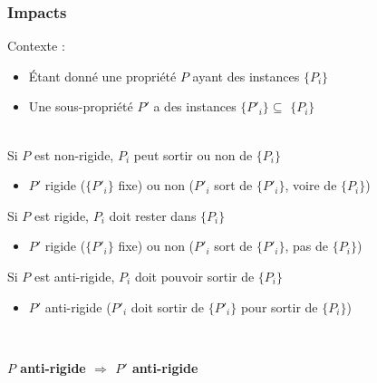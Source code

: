 \documentclass[draft]{beamer}
\begin{document}
\begin{frame}
\frametitle{Impacts}
\def\pa{$P$\xspace}
\def\pb{$P'$\xspace}
\def\ca{$\{P_i\}$\xspace}
\def\cb{$\{P'_i\}$\xspace}
\def\ia{$P_i$\xspace}
\def\ib{$P'_i$\xspace}
Contexte :
\begin{itemize}
 \item Étant donné une propriété \pa ayant des instances \ca
 \item Une sous-propriété \pb a des instances \cb $\subseteq$ \ca
\end{itemize}
~\\
Si \pa est non-rigide, \ia peut sortir ou non de \ca
\begin{itemize}
 \item \pb rigide (\cb fixe) ou non (\ib sort de \cb, voire de \ca)
\end{itemize}
Si \pa est rigide, \ia doit rester dans \ca
\begin{itemize}
 \item \pb rigide (\cb fixe) ou non (\ib sort de \cb, pas de \ca)
\end{itemize}
Si \pa est anti-rigide, \ia doit pouvoir sortir de \ca
\begin{itemize}
 \item \pb anti-rigide (\ib doit sortir de \cb pour sortir de \ca)
\end{itemize}
~\\
\begin{center}
 \textbf{$P$ anti-rigide $\Rightarrow$ $P'$ anti-rigide}
\end{center}
\end{frame}
\end{document}
